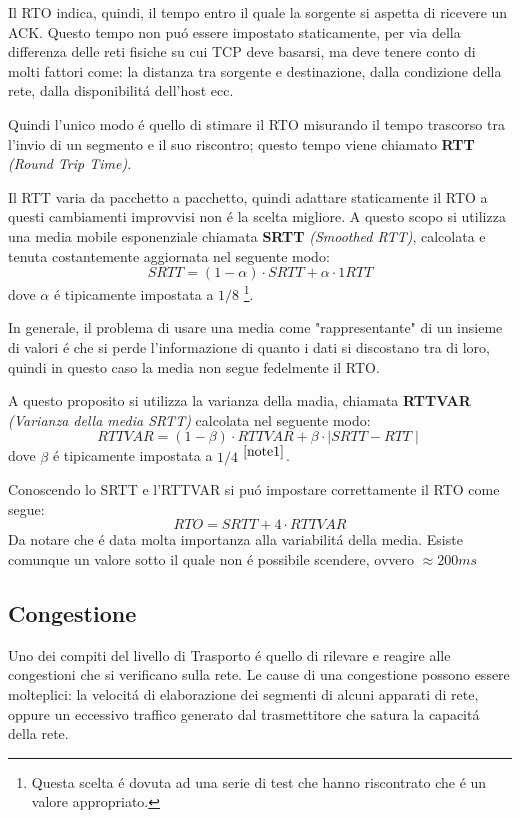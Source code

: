 \documentclass[12pt]{article}
\begin{document}
Il RTO indica, quindi, il tempo entro il quale la sorgente si aspetta di ricevere un ACK. Questo tempo non pu\'o 
essere impostato staticamente, per via della differenza delle reti fisiche su cui TCP deve basarsi, ma deve tenere 
conto di molti fattori come: la distanza tra sorgente e destinazione, dalla condizione della rete, dalla 
disponibilit\'a dell'host ecc.

Quindi l'unico modo \'e quello di stimare il RTO misurando il tempo trascorso tra l'invio di un segmento e il suo 
riscontro; questo tempo viene chiamato \textbf{RTT} \textit{(Round Trip Time)}.

Il RTT varia da pacchetto a pacchetto, quindi adattare staticamente il RTO a questi cambiamenti improvvisi non \'e 
la scelta migliore.
A questo scopo si utilizza una media mobile esponenziale chiamata \textbf{SRTT} \textit{(Smoothed RTT)}, calcolata e 
tenuta costantemente aggiornata nel seguente modo:
\begin{equation}\label{eq:srtt}
	SRTT = (1-\alpha) \cdotp SRTT + \alpha \cdotp1 RTT
\end{equation}
dove $\alpha$ \'e tipicamente impostata a $1/8$ \footnote{\label{note1}Questa scelta \'e dovuta ad una serie di test 
che hanno riscontrato che \'e un valore appropriato.}. 

In generale, il problema di usare una media come "rappresentante" di un insieme di valori \'e che si perde 
l'informazione di quanto i dati si discostano tra di loro, quindi in questo caso la media non segue fedelmente il 
RTO. 

A questo proposito si utilizza la varianza della madia, chiamata \textbf{RTTVAR} \textit{(Varianza della media SRTT)} 
calcolata nel seguente modo:
\begin{equation}\label{eq:rttvar}
	RTTVAR = (1-\beta) \cdotp RTTVAR + \beta \cdotp \mid SRTT-RTT \mid
\end{equation}
dove $\beta$ \'e tipicamente impostata a $1/4$ $^{\ref{note1}}$.

Conoscendo lo SRTT e l'RTTVAR si pu\'o impostare correttamente il RTO come segue:
\begin{equation}\label{eq:rto}
	RTO = SRTT + 4 \cdotp RTTVAR
\end{equation}
Da notare che \'e data molta importanza alla variabilit\'a della media. Esiste comunque un valore sotto il quale non 
\'e possibile scendere, ovvero $\approx 200ms$

\clearpage
\subsection{Congestione}\label{tcp-congestione}
Uno dei compiti del livello di Trasporto \'e quello di rilevare e reagire alle congestioni che si verificano sulla 
rete. Le cause di una congestione possono essere molteplici: la velocit\'a di elaborazione dei segmenti di alcuni 
apparati di rete, oppure un eccessivo traffico generato dal trasmettitore che satura la capacit\'a della rete.
\end{document}
